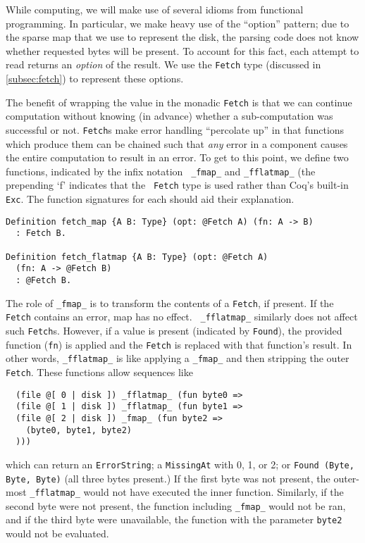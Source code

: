 \documentclass[nocopyrightspace]{sigplanconf}
\begin{document}
While computing, we will make use of several idioms from functional
programming.  In particular, we make heavy use of the ``option'' pattern; due
to the sparse map that we use to represent the disk, the parsing code does not
know whether requested bytes will be present. To account for this fact, each
attempt to read returns an {\em option} of the result. We use the {\tt Fetch}
type (discussed in \ref{subsec:fetch}) to represent these options.

The benefit of wrapping the value in the monadic {\tt Fetch} is that we can
continue computation without knowing (in advance) whether a sub-computation
was successful or not. {\tt Fetch}s make error handling ``percolate up'' in
that functions which produce them can be chained such that {\em any} error
in a component causes the entire computation to result in an error. To get to
this point, we define two functions, indicated by the infix notation {\tt
\_fmap\_} and {\tt \_fflatmap\_} (the prepending `f' indicates that the {\tt
Fetch} type is used rather than Coq's built-in {\tt Exc}. The function
signatures for each should aid their explanation.

\begin{lstlisting}
Definition fetch_map {A B: Type} (opt: @Fetch A) (fn: A -> B)
  : Fetch B.

Definition fetch_flatmap {A B: Type} (opt: @Fetch A) 
  (fn: A -> @Fetch B)
  : @Fetch B.
\end{lstlisting}

The role of {\tt \_fmap\_} is to transform the contents of a {\tt Fetch}, if
present. If the {\tt Fetch} contains an error, map has no effect.  {\tt
\_fflatmap\_} similarly does not affect such {\tt Fetch}s. However, if a value
is present (indicated by {\tt Found}), the provided function ({\tt fn}) is
applied and the {\tt Fetch} is replaced with that function's result. In other
words, {\tt \_fflatmap\_} is like applying a {\tt \_fmap\_} and then stripping
the outer {\tt Fetch}. These functions allow sequences like

\begin{lstlisting}
  (file @[ 0 | disk ]) _fflatmap_ (fun byte0 =>
  (file @[ 1 | disk ]) _fflatmap_ (fun byte1 =>
  (file @[ 2 | disk ]) _fmap_ (fun byte2 =>
    (byte0, byte1, byte2)
  )))
\end{lstlisting}

which can return an {\tt ErrorString}; a {\tt MissingAt} with 0, 1, or 2; or
{\tt Found (Byte, Byte, Byte)} (all three bytes present.) If the first byte
was not present, the outer-most {\tt \_fflatmap\_} would not have executed the
inner function. Similarly, if the second byte were not present, the function
including {\tt \_fmap\_} would not be ran, and if the third byte were
unavailable, the function with the parameter {\tt byte2} would not be
evaluated.
\end{document}
